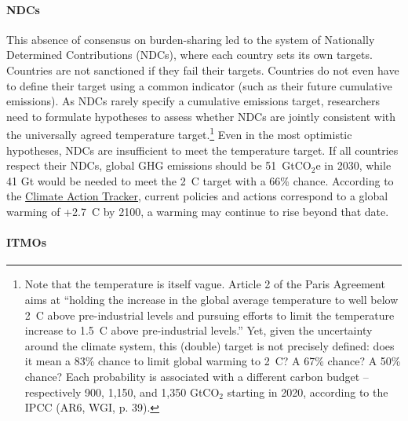 \documentclass[12pt,english]{article}
\begin{document}
\paragraph{NDCs} This absence of consensus on burden-sharing led to the system of Nationally Determined Contributions (NDCs), where each country sets its own targets. Countries are not sanctioned if they fail their targets. Countries do not even have to define their target using a common indicator (such as their future cumulative emissions). As NDCs rarely specify a cumulative emissions target, researchers need to formulate hypotheses to assess whether NDCs are jointly consistent with the universally agreed temperature target.\footnote{Note that the temperature is itself vague. Article 2 of the Paris Agreement aims at ``holding the increase in the global average temperature to well below 2~\textdegree{}C above pre-industrial levels and pursuing efforts to limit the temperature increase to 1.5~\textdegree{}C above pre-industrial levels.'' Yet, given the uncertainty around the climate system, this (double) target is not precisely defined: does it mean a 83\% chance to limit global warming to 2~\textdegree{}C? A 67\% chance? A 50\% chance? Each probability is associated with a different carbon budget -- respectively 900, 1,150, and 1,350 GtCO$_\text{2}$ starting in 2020, according to the IPCC (AR6, WGI, p. 39).} 
Even in the most optimistic hypotheses, NDCs are insufficient to meet the temperature target. If all countries respect their NDCs, global GHG emissions should be 51~GtCO$_\text{2}$e in 2030, while 41 Gt would be needed to meet the 2~\textdegree{}C target with a 66\% chance.\cite{den_elzen_updated_2022} According to the \href{https://climateactiontracker.org/}{Climate Action Tracker}, 
current policies and actions correspond to a global warming of +2.7~\textdegree{}C by 2100, a warming may continue to rise beyond that date.

\paragraph{ITMOs} 
\end{document}
